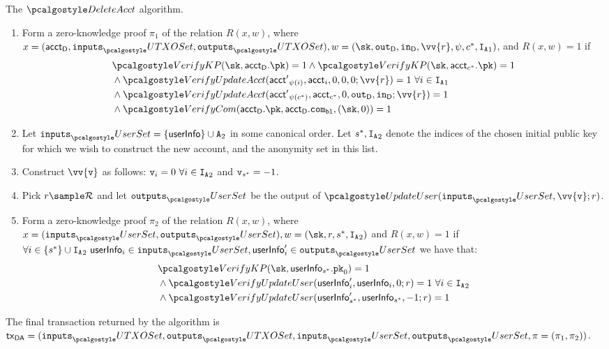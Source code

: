 \begin{boxfig}{\label{fig:deleteAcct}{The $\deleteAcct$ algorithm.}}
\begin{enumerate}
    \item Form a zero-knowledge proof $\pi_1$ of the relation $R(x, w)$, where \\
     $x = (\accttodelete, \inputs_\utxoset, \outputs_\utxoset), w = (\sk, \outdelete, \indelete, \vv{r}, \psi, c^*, {{\ianset}_1})$, and $R(x, w) = 1$ if 
    {\begin{align*}
        & \verkp(\sk, \accttodelete.\pk) = 1 \land \verkp(\sk, \acct_{c^*}.\pk) = 1\\
        & \land \verupdacc({\acct'}_{\psi(i)},{\acct}_i,0,0,0;\vv{r})=1 \ \forall i \in {{\ianset}_1} \\
        & \land \verupdacc({\acct'}_{\psi(c^*)},{\acct}_{c^*}, 0, \outdelete, \indelete ;\vv{r})=1 \\
        & \land \vercom(\accttodelete.\pk, \accttodelete.\com_{\varbl}, (\sk, 0)) = 1 \\
    \end{align*}}

    \item Let $\inputs_\usersset = \{\userinfo\} \cup \anset_2$ in some canonical order. Let $s^*, {{\mathtt{I}_{\mathtt{A}}}_2}$ denote the indices of the chosen initial public key for which we wish to construct the new account, and the anonymity set in this list. 
    \item Construct $\vv{\v}$ as follows: $\texttt{v}_i = 0 \ \forall i \in {{\mathtt{I}_{\mathtt{A}}}_2}$ and $\texttt{v}_{s^*} = -1$. 
    \item Pick $r \sample \randspace$ and let $\outputs_\usersset$ be the output of $\upduser(\inputs_\usersset, \vv{\v};r)$.
    \item Form a zero-knowledge proof $\pi_2$ of the relation $R(x, w)$, where 
     $x=(\inputs_\usersset, \outputs_\usersset), w = (\sk, r, s^*, {{\ianset}_2})$ and $R(x,w) = 1$ if $\forall i \in \{s^*\} \cup {{\ianset}_2} \ \userinfo_i \in \inputs_\usersset, \userinfo'_i \in \outputs_\usersset$ we have that:
        {\begin{align*}
            & \verkp(\sk, \userinfo_{s^*}.\inpk) = 1 \\
            & \land \verupduser(\userinfo'_i, \userinfo_i, 0;r) = 1 \ \forall i \in {{\ianset}_2} \\
            & \land \verupduser(\userinfo'_{s^*}, \userinfo_{s^*}, -1;r) = 1 \\
        \end{align*}}

\end{enumerate}


The final transaction returned by the algorithm is \\ $\txnda = (\inputs_\utxoset, \outputs_\utxoset, \inputs_\usersset, \outputs_\usersset, \pi = (\pi_1, \pi_2))$.

\end{boxfig}